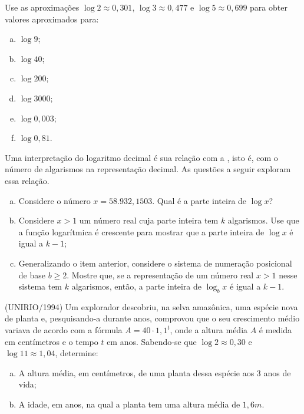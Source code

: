 \begin{exercise}
    Use as aproximações $\log 2 \approx 0,301$, $\log 3 \approx
0,477$ e $\log 5 \approx 0,699$ para obter valores aproximados para:
\begin{enumerate}[(a)]
  \item $\log 9$;
  \item $\log 40$;
  \item $\log 200$;
  \item $\log 3000$;
  \item $\log 0{,}003$;
  \item $\log 0{,}81$.
\end{enumerate}
\end{exercise}

\begin{exercise}
    Uma interpretação do logaritmo decimal é sua relação com a
, isto é, com o número de algarismos na
representação decimal. As questões a seguir exploram essa relação.
\begin{enumerate}[(a)]
  \item Considere o número $x = 58.932{,}1503$. Qual é a parte inteira de $\log x$?
  \item Considere $x>1$ um número real cuja parte inteira tem $k$ algarismos.
  Use que a função logarítmica é crescente para mostrar que a parte inteira
  de $\log x$ é igual a $k-1$;
  \item Generalizando o item anterior, considere o sistema de
  numeração posicional de base $b \geq 2$. Mostre que, se a
  representação de um número real $x>1$ nesse sistema tem $k$
  algarismos, então, a parte inteira de $\log_b x$ é igual a $k-1$.
\end{enumerate}
\end{exercise}

\begin{exercise}
    (UNIRIO/1994) Um explorador descobriu, na selva amazônica, uma
espécie nova de planta e, pesquisando-a durante anos, comprovou que
o seu crescimento médio variava de acordo com a fórmula $A = 40
\cdot 1{,}1^t$, onde a altura média $A$ é medida em centímetros e o
tempo $t$ em anos. Sabendo-se que $\log 2 \approx 0{,}30$ e $\log 11
\approx 1{,}04$, determine:
\begin{enumerate}[(a)]
  \item A altura média, em centímetros, de uma planta dessa espécie
  aos 3 anos de vida;
  \item A idade, em anos, na qual a planta tem uma altura média de
  $1{,}6 m$.
\end{enumerate}
\end{exercise}

